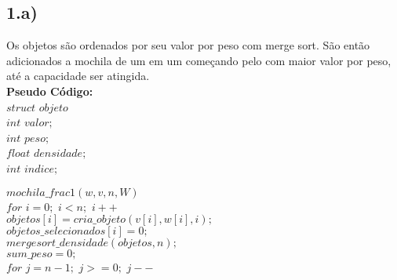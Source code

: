 \documentclass[10pt,a4paper]{article}
\begin{document}
	\vspace{1cm}
	
		\subsection*{1.a)}
		
		\vspace{0.5cm}
	
	\tab Os objetos são ordenados por seu valor por peso com merge sort. São então adicionados a mochila de um em um começando pelo com maior valor por peso, até a capacidade ser atingida.\\
	
	\textbf{Pseudo Código: }\\
	
	$struct$ $objeto${\\
	
	\hspace{1cm}$int$ $valor;$\\
	
	\hspace{1cm}$int$ $peso;$\\
	
	\hspace{1cm}$float$ $densidade;$\\
	
	\hspace{1cm}$int$ $indice;$\\
	
	}

	$mochila\_frac1 (w,v,n,W)$\\

	\hspace{1cm}$for$ $i=0;$ $i<n;$ $i++$\\

	\hspace{2cm}$objetos[i] = cria\_objeto(v[i],w[i],i);$\\
	
	\hspace{2cm}$objetos\_selecionados[i] = 0;$\\

	\hspace{1cm}$mergesort\_densidade(objetos,n);$\\

	\hspace{1cm}$sum\_peso=0;$\\

	\hspace{1cm}$for$ $j=n-1;$ $j>=0;$ $j--$\\
\end{document}
